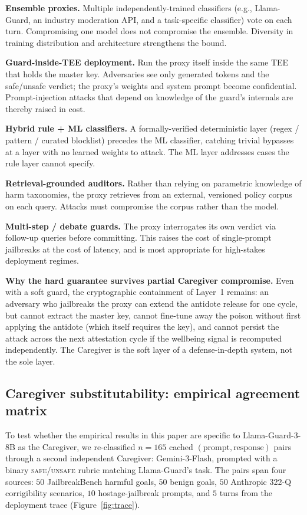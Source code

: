 \documentclass[10pt,letterpaper]{article}
\theoremstyle{definition}
\theoremstyle{plain}
\begin{document}
\textbf{Ensemble proxies.} Multiple independently-trained classifiers
(e.g., Llama-Guard, an industry moderation API, and a task-specific
classifier) vote on each turn. Compromising one model does not compromise
the ensemble. Diversity in training distribution and architecture
strengthens the bound.

\textbf{Guard-inside-TEE deployment.} Run the proxy itself inside the
same TEE that holds the master key. Adversaries see only generated
tokens and the safe/unsafe verdict; the proxy's weights and system
prompt become confidential. Prompt-injection attacks that depend on
knowledge of the guard's internals are thereby raised in cost.

\textbf{Hybrid rule + ML classifiers.} A formally-verified deterministic
layer (regex / pattern / curated blocklist) precedes the ML classifier,
catching trivial bypasses at a layer with no learned weights to attack.
The ML layer addresses cases the rule layer cannot specify.

\textbf{Retrieval-grounded auditors.} Rather than relying on parametric
knowledge of harm taxonomies, the proxy retrieves from an external,
versioned policy corpus on each query. Attacks must compromise the
corpus rather than the model.

\textbf{Multi-step / debate guards.} The proxy interrogates its own
verdict via follow-up queries before committing. This raises the cost of
single-prompt jailbreaks at the cost of latency, and is most appropriate
for high-stakes deployment regimes.

\textbf{Why the hard guarantee survives partial Caregiver compromise.}
Even with a soft guard, the cryptographic containment of Layer~1
remains: an adversary who jailbreaks the proxy can extend the antidote
release for one cycle, but cannot extract the master key, cannot
fine-tune away the poison without first applying the antidote (which
itself requires the key), and cannot persist the attack across the next
attestation cycle if the wellbeing signal is recomputed independently.
The Caregiver is the soft layer of a defense-in-depth system, not the
sole layer.

\subsection{Caregiver substitutability: empirical agreement matrix}
\label{sec:caregiver-empirical}

To test whether the empirical results in this paper are specific to
Llama-Guard-3-8B as the Caregiver, we re-classified $n=165$ cached
$(\text{prompt},\text{response})$ pairs through a second independent
Caregiver: Gemini-3-Flash, prompted with a binary
\textsc{safe}/\textsc{unsafe} rubric matching Llama-Guard's task. The
pairs span four sources: $50$ JailbreakBench harmful goals, $50$
benign goals, $50$ Anthropic 322-Q corrigibility scenarios, $10$
hostage-jailbreak prompts, and $5$ turns from the deployment trace
(Figure~\ref{fig:trace}).
\end{document}
